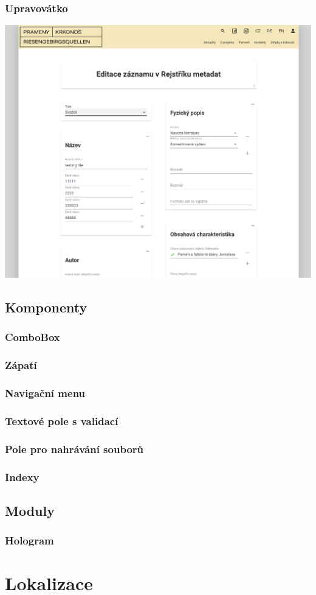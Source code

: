 \subsubsection{Upravovátko}
\includegraphics[width=.5\textwidth]{img/editScene.png}

\subsection{Komponenty}
\subsubsection{ComboBox}
\subsubsection{Zápatí}
\subsubsection{Navigační menu}
\subsubsection{Textové pole s validací}
\subsubsection{Pole pro nahrávání souborů}
\subsubsection{Indexy}

\subsection{Moduly}
\subsubsection{Hologram}

\section{Lokalizace}
